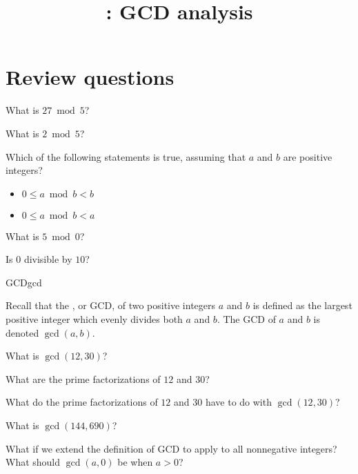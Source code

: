 \documentclass{tufte-handout}
\title{\thecourse: GCD analysis}
\date{}
\begin{document}
\maketitle

\section{Review questions}

\begin{questions}
  \item What is $27 \bmod 5$?
  \item What is $2 \bmod 5$?
  \item Which of the following statements is true, assuming that $a$
    and $b$ are positive integers?
    \begin{itemize}
    \item $0 \leq a \bmod b < b$
    \item $0 \leq a \bmod b < a$
    \end{itemize}
  \item What is $5 \bmod 0$?
  \item Is $0$ divisible by $10$?
\end{questions}

\newpage
\begin{model*}{GCD}{gcd}
\begin{defn}
  Recall that the , or GCD, of two
  positive integers $a$ and $b$ is defined as the largest positive
  integer which evenly divides both $a$ and $b$.  The GCD of $a$ and
  $b$ is denoted $\gcd(a,b)$.
\end{defn}
\end{model*}

\begin{questions}
\item What is $\gcd(12,30)$?
\item What are the prime factorizations of $12$ and $30$?
\item What do the prime factorizations of $12$ and $30$ have to do
  with $\gcd(12,30)$?
\item What is $\gcd(144, 690)$?
\item What if we extend the definition of GCD to apply to all
  nonnegative integers?  What should $\gcd(a,0)$ be when $a > 0$?
\end{questions}

\newpage
\end{document}
